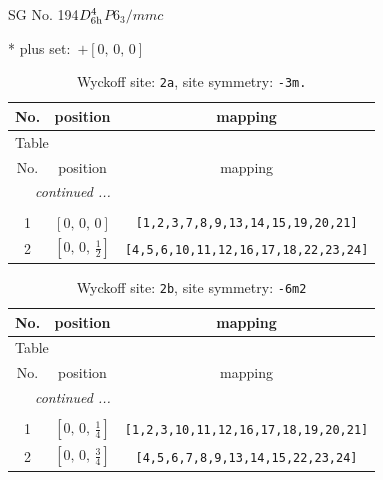 \documentclass[fleqn,8pt]{jsarticle}
\begin{document}
\setcounter{MaxMatrixCols}{32}

\renewcommand{\tablename}{Table~}
\renewcommand{\figurename}{Figure~}
\begin{center}
\LARGE
SG No. 194\quad$D_{\rm 6h}^{4}$\quad$P6_3/mmc$\quad[ hexagonal ]
\end{center}
* plus set:\,\,\,$+\left[ 0,\, 0,\, 0 \right]$
\renewcommand{\arraystretch}{1.2}
\begin{longtable}{ccc}
\caption{Wyckoff site: {\tt 2a}, site symmetry: {\tt -3m.}}
 \\
 \hline \hline
No. & position & mapping \\ \hline \endfirsthead

\multicolumn{2}{l}{\tablename\ \thetable{}} \\
 \hline \hline
No. & position & mapping \\ \hline \endhead

 \hline \hline
\multicolumn{2}{r}{\footnotesize\it continued ...} \\ \endfoot

 \hline \hline
\multicolumn{2}{r}{} \\ \endlastfoot

1 & $\left[ 0,\, 0,\, 0 \right]$ & {\tt [1,2,3,7,8,9,13,14,15,19,20,21]} \\ \hline
2 & $\left[ 0,\, 0,\, \frac{1}{2} \right]$ & {\tt [4,5,6,10,11,12,16,17,18,22,23,24]} \\
\end{longtable}
\renewcommand{\arraystretch}{1.2}
\begin{longtable}{ccc}
\caption{Wyckoff site: {\tt 2b}, site symmetry: {\tt -6m2}}
 \\
 \hline \hline
No. & position & mapping \\ \hline \endfirsthead

\multicolumn{2}{l}{\tablename\ \thetable{}} \\
 \hline \hline
No. & position & mapping \\ \hline \endhead

 \hline \hline
\multicolumn{2}{r}{\footnotesize\it continued ...} \\ \endfoot

 \hline \hline
\multicolumn{2}{r}{} \\ \endlastfoot

1 & $\left[ 0,\, 0,\, \frac{1}{4} \right]$ & {\tt [1,2,3,10,11,12,16,17,18,19,20,21]} \\ \hline
2 & $\left[ 0,\, 0,\, \frac{3}{4} \right]$ & {\tt [4,5,6,7,8,9,13,14,15,22,23,24]} \\
\end{longtable}
\end{document}
